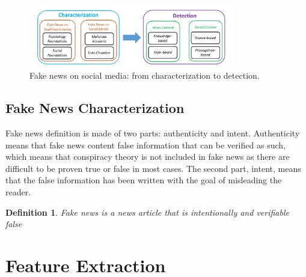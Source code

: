 \begin{figure}
 \centering
 \includegraphics[width=0.8\textwidth]{images/introduction/characterization.png}
 \caption{Fake news on social media: from characterization to detection.\cite{shu2017fake}}
 \label{fig:intro:characterization}
\end{figure}
\subsection{Fake News Characterization}
Fake news definition is made of two parts: authenticity and intent. Authenticity means that fake news content false information that can be verified as such, which means that conspiracy theory is not included in fake news as there are difficult to be proven true or false in most cases. The second part, intent, means that the false information has been written with the goal of misleading the reader. 
\newtheorem{def:fake_news}{Definition}
\begin{def:fake_news}
Fake news is a news article that is intentionally and verifiable false
\end{def:fake_news}

\section{Feature Extraction} \label{intro:feature_extract}
